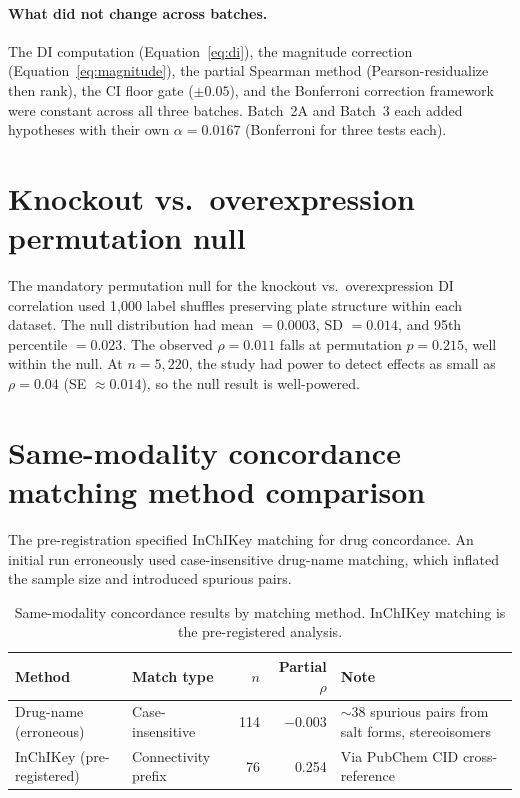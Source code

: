 \documentclass[11pt]{article}
\begin{document}
\paragraph{What did not change across batches.}
The DI computation (Equation~\ref{eq:di}), the magnitude correction
(Equation~\ref{eq:magnitude}), the partial Spearman method
(Pearson-residualize then rank), the CI floor gate ($\pm 0.05$), and
the Bonferroni correction framework were constant across all three
batches.  Batch~2A and Batch~3 each added hypotheses with their own
$\alpha = 0.0167$ (Bonferroni for three tests each).

\section{Knockout vs.\ overexpression permutation null}
\label{app:permutation}

The mandatory permutation null for the knockout vs.\
overexpression DI correlation used 1{,}000 label shuffles preserving
plate structure within each dataset.  The null distribution had mean
$= 0.0003$, SD $= 0.014$, and 95th percentile $= 0.023$.  The observed
$\rho = 0.011$ falls at permutation $p = 0.215$, well within the null.
At $n = 5{,}220$, the study had power to detect effects as small as
$\rho = 0.04$ (SE $\approx 0.014$), so the null result is well-powered.

\section{Same-modality concordance matching method comparison}
\label{app:a1matching}

The pre-registration specified InChIKey matching for drug concordance.
An initial run erroneously used case-insensitive drug-name matching,
which inflated the sample size and introduced spurious pairs.

\vspace{1em}
\begin{table}[h]
\centering
\caption{Same-modality concordance results by matching method.  InChIKey
matching is the pre-registered analysis.}
\label{tab:a1match}
\small
\begin{tabular}{llrrp{4cm}}
\toprule
Method & Match type & $n$ & Partial $\rho$ & Note \\
\midrule
Drug-name (erroneous) & Case-insensitive & 114 & $-0.003$ &
  ${\sim}$38 spurious pairs from salt forms, stereoisomers \\
InChIKey (pre-registered) & Connectivity prefix & 76 & 0.254 &
  Via PubChem CID cross-reference \\
\bottomrule
\end{tabular}
\end{table}
\end{document}
